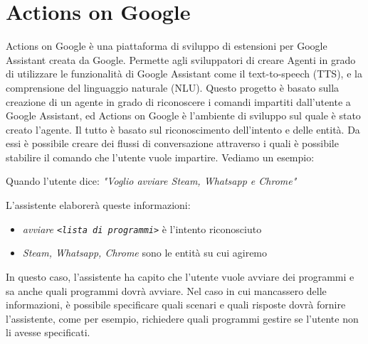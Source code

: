 \section{Actions on Google}
Actions on Google è una piattaforma di sviluppo di estensioni per Google Assistant creata da Google.
Permette agli sviluppatori di creare Agenti in grado di utilizzare le funzionalità di Google Assistant come il text-to-speech (TTS), e la comprensione del linguaggio naturale (NLU).
Questo progetto è basato sulla creazione di un agente in grado di riconoscere i comandi impartiti dall'utente a Google Assistant, ed Actions on Google è l'ambiente di sviluppo sul quale è stato creato l'agente.
Il tutto è basato sul riconoscimento dell'intento e delle entità. Da essi è possibile creare dei flussi di conversazione attraverso i quali è possibile stabilire il comando che l'utente vuole impartire.
Vediamo un esempio:

\begin{center}
    Quando l'utente dice: \textit{"Voglio avviare Steam, Whatsapp e Chrome"}
\end{center}
L'assistente elaborerà queste informazioni:
\begin{itemize}
    \item \textit{avviare \lstinline{<lista di programmi>}} è l'intento riconosciuto
    \item \textit{Steam, Whatsapp, Chrome} sono le entità su cui agiremo
\end{itemize}

In questo caso, l'assistente ha capito che l'utente vuole avviare dei programmi e sa anche quali programmi dovrà avviare.
Nel caso in cui mancassero delle informazioni, è possibile specificare quali scenari e quali risposte dovrà fornire l'assistente, come per esempio, richiedere quali programmi gestire se l'utente non li avesse specificati.